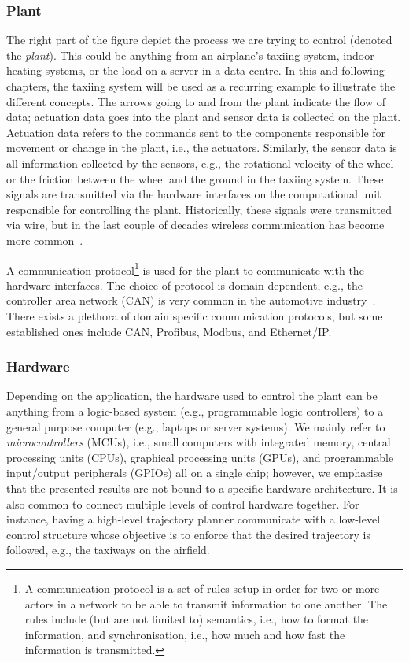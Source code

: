 \subsubsection{Plant}%
%
The right part of the figure depict the process we are trying to control (denoted the \emph{plant}).
This could be anything from an airplane's taxiing system, indoor heating systems, or the load on a server in a data centre.
In this and following chapters, the taxiing system will be used as a recurring example to illustrate the different concepts.
The arrows going to and from the plant indicate the flow of data; actuation data goes into the plant and sensor data is collected on the plant.
Actuation data refers to the commands sent to the components responsible for movement or change in the plant, i.e., the actuators.
Similarly, the sensor data is all information collected by the sensors, e.g., the rotational velocity of the wheel or the friction between the wheel and the ground in the taxiing system.
These signals are transmitted via the hardware interfaces on the computational unit responsible for controlling the plant.
Historically, these signals were transmitted via wire, but in the last couple of decades wireless communication has become more common~\addref{}.

A communication protocol\footnote{A communication protocol is a set of rules setup in order for two or more actors in a network to be able to transmit information to one another. The rules include (but are not limited to) semantics, i.e., how to format the information, and synchronisation, i.e., how much and how fast the information is transmitted.} is used for the plant to communicate with the hardware interfaces.
The choice of protocol is domain dependent, e.g., the controller area network (CAN) is very common in the automotive industry~\addref{}.
There exists a plethora of domain specific communication protocols, but some established ones include CAN, Profibus, Modbus, and Ethernet/IP.

\subsubsection{Hardware}%
%
Depending on the application, the hardware used to control the plant can be anything from a logic-based system (e.g., programmable logic controllers) to a general purpose computer (e.g., laptops or server systems).
We mainly refer to \emph{microcontrollers} (MCUs), i.e., small computers with integrated memory, central processing units (CPUs), graphical processing units (GPUs), and programmable input/output peripherals (GPIOs) all on a single chip; however, we emphasise that the presented results are not bound to a specific hardware architecture.
It is also common to connect multiple levels of control hardware together.
For instance, having a high-level trajectory planner communicate with a low-level control structure whose objective is to enforce that the desired trajectory is followed, e.g., the taxiways on the airfield.

